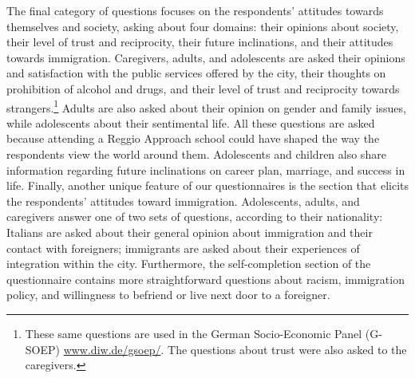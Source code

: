 The final category of questions focuses on the respondents' attitudes
towards themselves and society, asking about four domains: their opinions
about society, their level of trust and reciprocity, their future
inclinations, and their attitudes towards immigration. Caregivers, adults,
and adolescents are asked their opinions and satisfaction with the
public services offered by the city, their thoughts on prohibition of
alcohol and drugs, and their level of trust and reciprocity towards
strangers.\footnote{%
These same questions are used in the German Socio-Economic Panel (G-SOEP) %
\url{www.diw.de/gsoep/}. The questions about trust
were also asked to the caregivers.} Adults are also asked about their
opinion on gender and family issues, while adolescents about their
sentimental life. All these questions are asked because attending a Reggio Approach school could have
shaped the way the respondents view the world around them. Adolescents and
children also share information regarding future inclinations on career plan, marriage, and success in life. Finally, another unique feature of our questionnaires is the section that elicits the respondents' attitudes toward immigration. Adolescents, adults, and caregivers answer one of two sets of questions, according to their nationality: Italians are asked about their general opinion about immigration and their contact with foreigners; immigrants are asked about their experiences of integration within the city. Furthermore, the self-completion section of the questionnaire contains more straightforward questions about racism, immigration policy, and willingness to befriend or live next door to a foreigner.